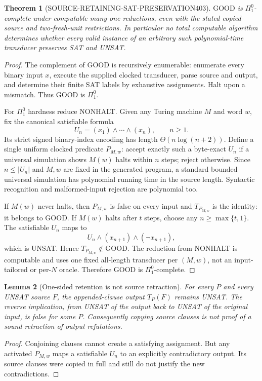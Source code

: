 \documentclass[11pt]{article}
\newtheorem{theorem}{Theorem}
\newtheorem{lemma}[theorem]{Lemma}
\begin{document}
\begin{theorem}[SOURCE-RETAINING-SAT-PRESERVATION403]
$\mathrm{GOOD}$ is $\Pi^0_1$-complete under computable many-one reductions, even with the stated copied-source and two-fresh-unit restrictions. In particular no total computable algorithm determines whether every valid instance of an arbitrary such polynomial-time transducer preserves SAT and UNSAT.
\end{theorem}
\begin{proof}
The complement of GOOD is recursively enumerable: enumerate every binary input $x$, execute the supplied clocked transducer, parse source and output, and determine their finite SAT labels by exhaustive assignments. Halt upon a mismatch. Thus GOOD is $\Pi^0_1$.

For $\Pi^0_1$ hardness reduce NONHALT. Given any Turing machine $M$ and word $w$, fix the canonical satisfiable formula
\[
U_n=(x_1)\wedge\cdots\wedge(x_n),\qquad n\ge1.
\]
Its strict signed binary-index encoding has length $\Theta(n\log(n+2))$. Define a single uniform clocked predicate $P_{M,w}$: accept exactly such a byte-exact $U_n$ if a universal simulation shows $M(w)$ halts within $n$ steps; reject otherwise. Since $n\le |U_n|$ and $M,w$ are fixed in the generated program, a standard bounded universal simulation has polynomial running time in the source length. Syntactic recognition and malformed-input rejection are polynomial too.

If $M(w)$ never halts, then $P_{M,w}$ is false on every input and $T_{P_{M,w}}$ is the identity: it belongs to GOOD. If $M(w)$ halts after $t$ steps, choose any $n\ge\max\{t,1\}$. The satisfiable $U_n$ maps to
\[
U_n\wedge(x_{n+1})\wedge(\neg x_{n+1}),
\]
which is UNSAT. Hence $T_{P_{M,w}}\notin\mathrm{GOOD}$. The reduction from NONHALT is computable and uses one fixed all-length transducer per $(M,w)$, not an input-tailored or per-$N$ oracle. Therefore GOOD is $\Pi^0_1$-complete.
\end{proof}

\begin{lemma}[One-sided retention is not source retraction]
For every $P$ and every UNSAT source $F$, the appended-clause output $T_P(F)$ remains UNSAT. The reverse implication, from UNSAT of the output back to UNSAT of the original input, is false for some $P$. Consequently copying source clauses is not proof of a sound retraction of output refutations.
\end{lemma}
\begin{proof}
Conjoining clauses cannot create a satisfying assignment. But any activated $P_{M,w}$ maps a satisfiable $U_n$ to an explicitly contradictory output. Its source clauses were copied in full and still do not justify the new contradictions.
\end{proof}
\end{document}

